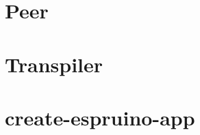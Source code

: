 \documentclass{l4proj}
\begin{document}
\begin{appendices}
\section{Peer}
\section{Transpiler}
\section{create-espruino-app}
\end{appendices}






\end{document}
